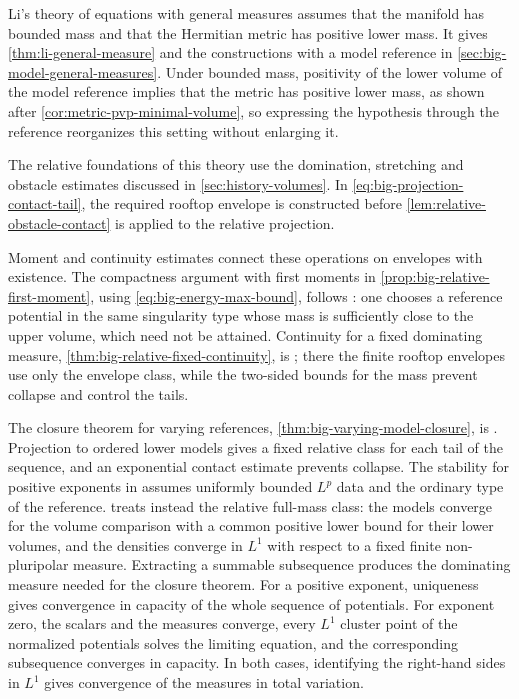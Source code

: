 Li's theory of equations with general measures \cite[v1, Theorems 6.1--6.2 and Corollary 6.1]{XL26} assumes that the manifold has bounded mass and that the Hermitian metric has positive lower mass. It gives \cref{thm:li-general-measure} and the constructions with a model reference in \cref{sec:big-model-general-measures}. Under bounded mass, positivity of the lower volume of the model reference implies that the metric has positive lower mass, as shown after \cref{cor:metric-pvp-minimal-volume}, so expressing the hypothesis through the reference reorganizes this setting without enlarging it.

The relative foundations of this theory use the domination, stretching and obstacle estimates discussed in \cref{sec:history-volumes}. In \eqref{eq:big-projection-contact-tail}, the required rooftop envelope is constructed before \cref{lem:relative-obstacle-contact} is applied to the relative projection.

Moment and continuity estimates connect these operations on envelopes with existence. The compactness argument with first moments in \cref{prop:big-relative-first-moment}, using \eqref{eq:big-energy-max-bound}, follows \cite[v1, Proposition 4.2]{XL26}: one chooses a reference potential in the same singularity type whose mass is sufficiently close to the upper volume, which need not be attained. Continuity for a fixed dominating measure, \cref{thm:big-relative-fixed-continuity}, is \cite[v1, Theorem 4.2]{XL26}; there the finite rooftop envelopes use only the envelope class, while the two-sided bounds for the mass prevent collapse and control the tails.

The closure theorem for varying references, \cref{thm:big-varying-model-closure}, is \cite[v1, Corollary 4.1]{XL26}. Projection to ordered lower models gives a fixed relative class for each tail of the sequence, and an exponential contact estimate prevents collapse. The stability for positive exponents in \cite[v1, Corollary 6.2]{XL26} assumes uniformly bounded $L^p$ data and the ordinary type of the reference.  treats instead the relative full-mass class: the models converge for the volume comparison with a common positive lower bound for their lower volumes, and the densities converge in $L^1$ with respect to a fixed finite non-pluripolar measure. Extracting a summable subsequence produces the dominating measure needed for the closure theorem. For a positive exponent, uniqueness gives convergence in capacity of the whole sequence of potentials. For exponent zero, the scalars and the measures converge, every $L^1$ cluster point of the normalized potentials solves the limiting equation, and the corresponding subsequence converges in capacity. In both cases, identifying the right-hand sides in $L^1$ gives convergence of the measures in total variation.

